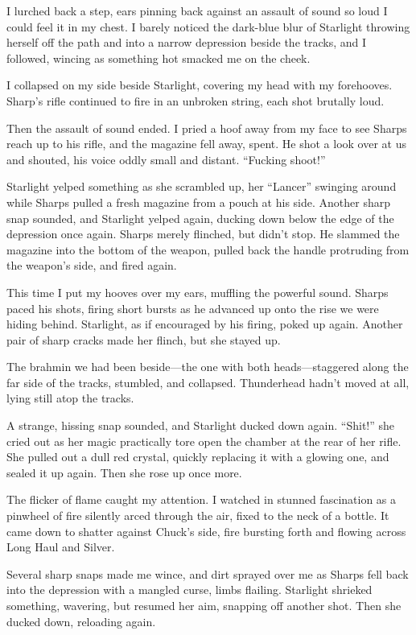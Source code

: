 I lurched back a step, ears pinning back against an assault of sound so loud I could feel it in my chest. I barely noticed the dark-blue blur of Starlight throwing herself off the path and into a narrow depression beside the tracks, and I followed, wincing as something hot smacked me on the cheek.

I collapsed on my side beside Starlight, covering my head with my forehooves. Sharp’s rifle continued to fire in an unbroken string, each shot brutally loud.

Then the assault of sound ended. I pried a hoof away from my face to see Sharps reach up to his rifle, and the magazine fell away, spent. He shot a look over at us and shouted, his voice oddly small and distant. “Fucking shoot!”

Starlight yelped something as she scrambled up, her “Lancer” swinging around while Sharps pulled a fresh magazine from a pouch at his side. Another sharp snap sounded, and Starlight yelped again, ducking down below the edge of the depression once again. Sharps merely flinched, but didn’t stop. He slammed the magazine into the bottom of the weapon, pulled back the handle protruding from the weapon’s side, and fired again.

This time I put my hooves over my ears, muffling the powerful sound. Sharps paced his shots, firing short bursts as he advanced up onto the rise we were hiding behind. Starlight, as if encouraged by his firing, poked up again. Another pair of sharp cracks made her flinch, but she stayed up.

The brahmin we had been beside—the one with both heads—staggered along the far side of the tracks, stumbled, and collapsed. Thunderhead hadn’t moved at all, lying still atop the tracks.

A strange, hissing snap sounded, and Starlight ducked down again. “Shit!” she cried out as her magic practically tore open the chamber at the rear of her rifle. She pulled out a dull red crystal, quickly replacing it with a glowing one, and sealed it up again. Then she rose up once more.

The flicker of flame caught my attention. I watched in stunned fascination as a pinwheel of fire silently arced through the air, fixed to the neck of a bottle. It came down to shatter against Chuck’s side, fire bursting forth and flowing across Long Haul and Silver.

Several sharp snaps made me wince, and dirt sprayed over me as Sharps fell back into the depression with a mangled curse, limbs flailing. Starlight shrieked something, wavering, but resumed her aim, snapping off another shot. Then she ducked down, reloading again.

